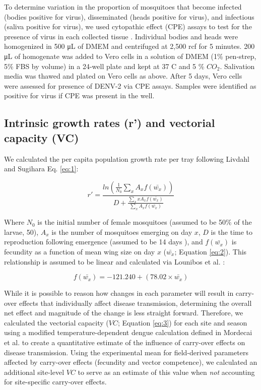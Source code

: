 \documentclass[12pt]{article}
\begin{document}
To determine variation in the proportion of mosquitoes that become infected (bodies positive for virus), disseminated (heads positive for virus), and infectious (saliva positive for virus), we used cytopathic effect (CPE) assays to test for the presence of virus in each collected tissue \cite{willard2017}.
Individual bodies and heads were homogenized in 500 \si{\micro\liter} of DMEM and centrifuged at 2,500 rcf for 5 minutes. 200 \si{\micro\liter} of homogenate was added to Vero cells in a solution of DMEM (1\% pen-strep, 5\% FBS by volume) in a 24-well plate and kept at 37 \degree C and 5 \% ${CO_2}$.
Salivation media was thawed and plated on Vero cells as above.
After 5 days, Vero cells were assessed for presence of DENV-2 via CPE assays.
Samples were identified as positive for virus if CPE was present in the well.

\subsection*{Intrinsic growth rates (r') and vectorial capacity (VC)}

We calculated the per capita population growth rate per tray following Livdahl and Sugihara \cite{livdahl1984} {Eq. \ref{eq:1}}:

\begin{equation} \label{eq:1}
r' = \frac{ln(\frac{1}{N_0}\sum_{x}^{ }{A_x}f(\bar{w_x}))}{D+\frac{\sum_{x}^{ }xA_xf(\bar{w_x})}{\sum_{x}^{ }A_xf(\bar{w_x})}}
\end{equation}

Where $N_0$ is the initial number of female mosquitoes (assumed to be 50\% of the larvae, 50), $A_x$ is the number of mosquitoes emerging on day $x$, $D$ is the time to reproduction following emergence (assumed to be 14 days \cite{livdahl1991}), and $f(\bar{w_x})$ is fecundity as a function of mean wing size on day $x$ ($\bar{w_x}$; Equation \ref{eq:2}).
This relationship is assumed to be linear and calculated via Lounibos et al. \cite{lounibos2002}:

\begin{equation} \label{eq:2}
f(\bar{w_x}) = -121.240 + (78.02 \times \bar{w_x})
\end{equation}

While it is possible to reason how changes in each parameter will result in carry-over effects that individually affect disease transmission, determining the overall net effect and magnitude of the change is less straight forward.
Therefore, we calculated the vectorial capacity ($VC$; Equation \ref{eq:3}) for each site and season using a modified temperature-dependent dengue calculation defined in Mordecai et al. \cite{mordecai2017} to create a quantitative estimate of the influence of carry-over effects on disease transmission.
Using the experimental mean for field-derived parameters affected by carry-over effects (fecundity and vector competence), we calculated an additional site-level $VC$ to serve as an estimate of this value when \textit{not} accounting for site-specific carry-over effects.
\end{document}
